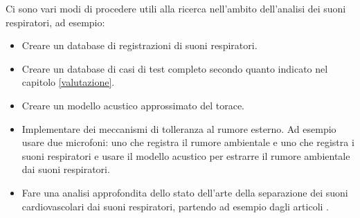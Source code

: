     Ci sono vari modi di procedere utili alla ricerca nell'ambito dell'analisi dei suoni respiratori, ad esempio:
    \begin{itemize}
      \item
	Creare un database di registrazioni di suoni respiratori.
      \item	
	Creare un database di casi di test completo secondo quanto indicato nel capitolo \ref{valutazione}. 
      \item	
	Creare un modello acustico approssimato del torace.
      \item
	Implementare dei meccanismi di tolleranza al rumore esterno. 
	Ad esempio usare due microfoni: uno che registra il rumore ambientale e uno che registra i suoni respiratori e usare il modello acustico per estrarre il rumore ambientale dai suoni respiratori.
      \item
	Fare una analisi approfondita dello stato dell'arte della separazione dei suoni cardiovascolari dai suoni respiratori, partendo ad esempio dagli articoli \cite{separazione1, separazione2, separazione3, separazione4, separazione5, separazione6}.
    \end{itemize}